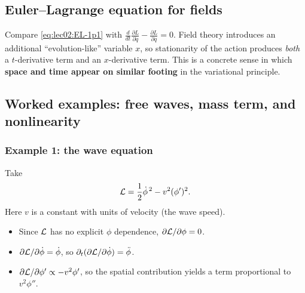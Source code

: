\subsection*{Euler--Lagrange equation for fields}


\begin{remark}
Compare \eqref{eq:lec02:EL-1p1} with
\(\frac{d}{dt}\frac{\partial L}{\partial \dot q}-\frac{\partial L}{\partial q}=0\).
Field theory introduces an additional ``evolution-like'' variable \(x\),
so stationarity of the action produces \emph{both} a \(t\)-derivative term
and an \(x\)-derivative term. This is a concrete sense in which
\textbf{space and time appear on similar footing} in the variational
principle.
\end{remark}

\subsection*{Worked examples: free waves, mass term, and nonlinearity}

\subsubsection*{Example 1: the wave equation}

Take
\begin{equation}
  \mathcal{L} = \frac12 \dot\phi^{\,2} - v^2(\phi')^2.
  \label{eq:lec02:L-wave}
\end{equation}
Here \(v\) is a constant with units of velocity (the wave speed).

\begin{itemize}
  \item Since \(\mathcal{L}\) has no explicit \(\phi\) dependence,
    \(\partial\mathcal{L}/\partial\phi = 0\).
  \item \(\partial\mathcal{L}/\partial\dot\phi = \dot\phi\), so
    \(\partial_t(\partial\mathcal{L}/\partial\dot\phi)=\ddot\phi\).
  \item \(\partial\mathcal{L}/\partial\phi'\propto -v^2\phi'\), so the spatial
    contribution yields a term proportional to \(v^2\phi''\).
\end{itemize}


